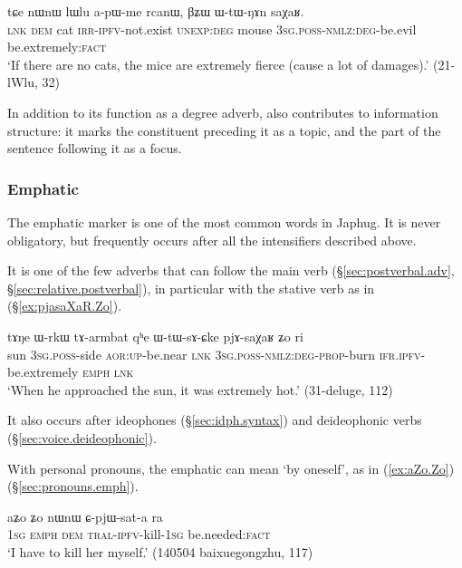 \begin{exe}
	\ex \label{ex:apWme.rcanW}
	\gll  tɕe nɯnɯ lɯlu a-pɯ-me rcanɯ, βʑɯ ɯ-tɯ-ŋɤn saχaʁ. \\
	\textsc{lnk} \textsc{dem} cat \textsc{irr}-\textsc{ipfv}-not.exist \textsc{unexp}:\textsc{deg} mouse
	\textsc{3sg}.\textsc{poss}-\textsc{nmlz}:\textsc{deg}-be.evil be.extremely:\textsc{fact} \\ 
	\glt `If there are no cats, the mice are extremely fierce (cause a lot of damages).' (21-lWlu, 32) 
\end{exe}

In addition to its function as a degree adverb,   also contributes to information structure: it marks the constituent preceding it as a topic, and the part of the sentence following it as a focus.
 
\subsubsection{Emphatic} \label{sec:emphatic.Zo} 
The emphatic marker  is one of the most common words in Japhug. It is never obligatory, but frequently occurs after all the intensifiers described above. 

It is one of the few adverbs that can follow the main verb (§\ref{sec:postverbal.adv}, §\ref{sec:relative.postverbal}), in particular with the stative verb  as in (§\ref{ex:pjasaXaR.Zo}).

\begin{exe}
	\ex \label{ex:pjasaXaR.Zo}
	\gll tɤŋe ɯ-rkɯ tɤ-armbat qʰe ɯ-tɯ-sɤ-ɕke pjɤ-saχaʁ ʑo ri \\
	sun \textsc{3sg}.\textsc{poss}-side \textsc{aor}:\textsc{up}-be.near \textsc{lnk} \textsc{3sg}.\textsc{poss}-\textsc{nmlz}:\textsc{deg}-\textsc{prop}-burn \textsc{ifr}.\textsc{ipfv}-be.extremely \textsc{emph} \textsc{lnk} \\
	\glt `When he approached the sun, it was extremely hot.' (31-deluge, 112)
	\end{exe}
	
It also occurs after ideophones (§\ref{sec:idph.syntax}) and deideophonic verbs (§\ref{sec:voice.deideophonic}).

With personal pronouns, the emphatic  can mean `by oneself', as in (\ref{ex:aZo.Zo}) (§\ref{sec:pronouns.emph}).

\begin{exe}
\ex \label{ex:aZo.Zo}
\gll aʑo ʑo nɯnɯ ɕ-pjɯ-sat-a ra \\
\textsc{1sg} \textsc{emph} \textsc{dem} \textsc{tral}-\textsc{ipfv}-kill-\textsc{1sg} be.needed:\textsc{fact} \\
\glt `I have to kill her myself.' (140504 baixuegongzhu, 117)
\end{exe}


